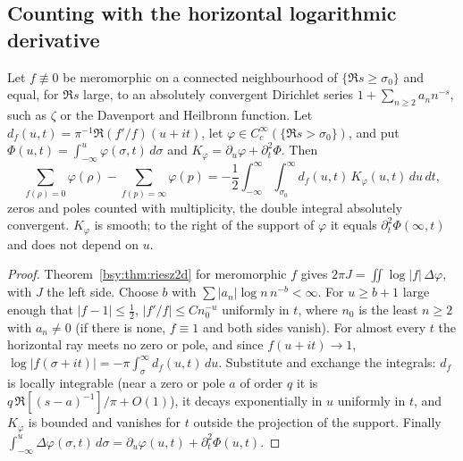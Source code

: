 \subsection{Counting with the horizontal logarithmic derivative}

\begin{theorem}\label{bsy:thm:thorincount}
Let $f\not\equiv0$ be meromorphic on a connected neighbourhood of $\{\Re s\ge\sigma_0\}$ and equal, for $\Re s$ large, to an absolutely convergent Dirichlet series $1+\sum_{n\ge2}a_nn^{-s}$, such as $\zeta$ or the Davenport and Heilbronn function. Let $d_f(u,t)=\pi^{-1}\Re(f'/f)(u+it)$, let $\varphi\in C_c^\infty(\{\Re s>\sigma_0\})$, and put $\Phi(u,t)=\int_{-\infty}^u\varphi(\sigma,t)\,d\sigma$ and $K_\varphi=\partial_u\varphi+\partial_t^2\Phi$. Then
\[
\sum_{f(\rho)=0}\varphi(\rho)-\sum_{f(p)=\infty}\varphi(p)=-\frac12\int_{-\infty}^\infty\int_{\sigma_0}^\infty d_f(u,t)\,K_\varphi(u,t)\,du\,dt,
\]
zeros and poles counted with multiplicity, the double integral absolutely convergent. $K_\varphi$ is smooth; to the right of the support of $\varphi$ it equals $\partial_t^2\Phi(\infty,t)$ and does not depend on $u$.
\end{theorem}

\begin{proof}
Theorem~\ref{bsy:thm:riesz2d} for meromorphic $f$ gives $2\pi J=\iint\log|f|\,\Delta\varphi$, with $J$ the left side. Choose $b$ with $\sum|a_n|\log n\,n^{-b}<\infty$. For $u\ge b+1$ large enough that $|f-1|\le\frac12$, $|f'/f|\le Cn_0^{-u}$ uniformly in $t$, where $n_0$ is the least $n\ge2$ with $a_n\ne0$ (if there is none, $f\equiv1$ and both sides vanish). For almost every $t$ the horizontal ray meets no zero or pole, and since $f(u+it)\to1$, $\log|f(\sigma+it)|=-\pi\int_\sigma^\infty d_f(u,t)\,du$. Substitute and exchange the integrals: $d_f$ is locally integrable (near a zero or pole $a$ of order $q$ it is $q\,\Re[(s-a)^{-1}]/\pi+O(1)$), it decays exponentially in $u$ uniformly in $t$, and $K_\varphi$ is bounded and vanishes for $t$ outside the projection of the support. Finally $\int_{-\infty}^u\Delta\varphi(\sigma,t)\,d\sigma=\partial_u\varphi(u,t)+\partial_t^2\Phi(u,t)$.
\end{proof}

